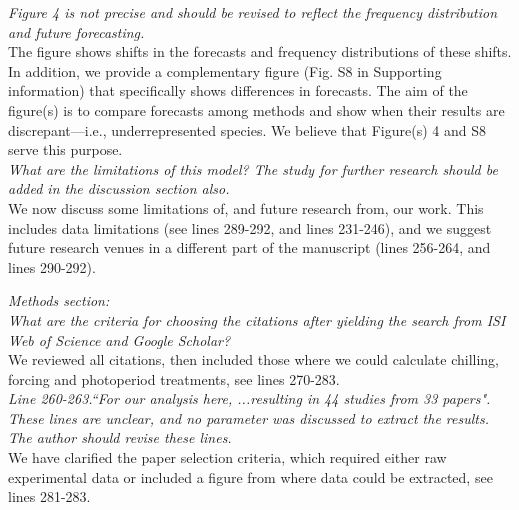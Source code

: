 \documentclass[11pt]{article}
\begin{document}
\emph{Figure 4 is not precise and should be revised to reflect the frequency distribution and future forecasting.}\\
The figure shows shifts in the forecasts and frequency distributions of these shifts. In addition, we provide a complementary figure (Fig. S8 in Supporting information) that specifically shows differences in forecasts. The aim of the figure(s) is to compare forecasts among methods and show when their results are discrepant---i.e., underrepresented species. We believe that Figure(s) 4 and S8 serve this purpose.\\


\emph{What are the limitations of this model? The study for further research should be added in the discussion section also.}\\
We now discuss some limitations of, and future research from, our work. This includes data limitations (see lines 289-292, and lines 231-246), and we suggest future research venues in a different part of the manuscript (lines 256-264, and lines 290-292).

\emph{Methods section:}\\
\emph{What are the criteria for choosing the citations after yielding the search from ISI Web of Science and Google Scholar?}\\
We reviewed all citations, then included those where we could calculate chilling, forcing and photoperiod treatments, see lines 270-283. \\

\emph{Line 260-263.``For our analysis here, ...resulting in 44 studies from 33 papers". These lines are unclear, and no parameter was discussed to extract the results. The author should revise these lines.}\\
We have clarified the paper selection criteria, which required either raw experimental data or included a figure from where data could be extracted, see lines 281-283. 
\end{document}
